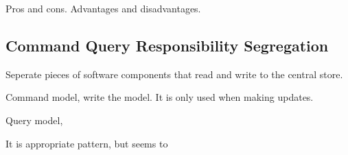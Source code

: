 {Pros and cons. Advantages and disadvantages.

\subsection{Command Query Responsibility Segregation}
Seperate pieces of software components that read and write to the central store.

Command model, write the model. It is only used when making updates.

Query model, 

It is appropriate pattern, but seems to 
}